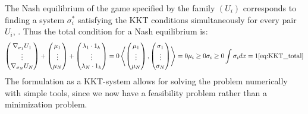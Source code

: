 The Nash equilibrium of the game specified by the family $(U_i)$ corresponds to finding a system $\sigma_i^*$ satisfying the KKT conditions simultaneously for every pair $U_i$, \citep{nonlinear_func_an}. Thus the total condition for a Nash equilibrium is:
\begin{equation}
  \begin{pmatrix}
    \nabla_{\sigma_1} U_1 \\
    \vdots \\
    \nabla_{\sigma_N} U_N
\end{pmatrix} + \begin{pmatrix}
    \mu_1 \\
    \vdots \\
    \mu_N
\end{pmatrix} + \begin{pmatrix}
    \lambda_1 \cdot 1_k \\
    \vdots \\
    \lambda_N \cdot 1_k
\end{pmatrix} = 0 \\
\ip{
\begin{pmatrix}
  \mu_1 \\
  \vdots \\
  \mu_N
\end{pmatrix}}{ \begin{pmatrix}
  \sigma_1 \\
  \vdots \\
  \sigma_N
\end{pmatrix}} = 0
\mu_i \geq 0 \\
  \sigma_i \geq 0 \\
    \int \sigma_i dx = 1
    \Cref{eq:KKT_total}
\end{equation}
The formulation as a KKT-system allows for solving the problem numerically with simple tools, since we now have a feasibility problem rather than a minimization problem.
